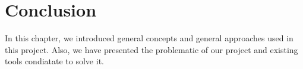 
\section*{Conclusion}
In this chapter, we introduced general concepts and general approaches
used in this project. Also, we have presented the problematic of our project and existing tools condiatate to solve it.
